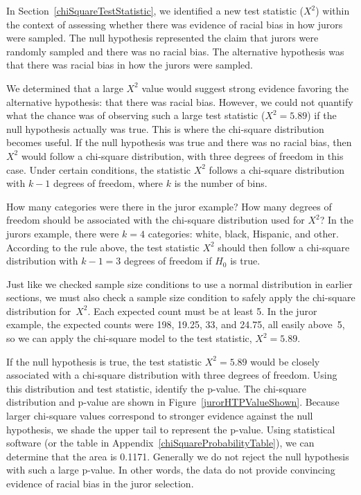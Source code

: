 In Section~\ref{chiSquareTestStatistic}, we identified a new test statistic ($X^2$) within the context of assessing whether there was evidence of racial bias in how jurors were sampled. The null hypothesis represented the claim that jurors were randomly sampled and there was no racial bias. The alternative hypothesis was that there was racial bias in how the jurors were sampled.

We determined that a large $X^2$ value would suggest strong evidence favoring the alternative hypothesis: that there was racial bias. However, we could not quantify what the chance was of observing such a large test statistic ($X^2=5.89$) if the null hypothesis actually was true. This is where the chi-square distribution becomes useful. If the null hypothesis was true and there was no racial bias, then $X^2$ would follow a chi-square distribution, with three degrees of freedom in this case. Under certain conditions, the statistic $X^2$ follows a chi-square distribution with $k - 1$ degrees of freedom, where $k$ is the number of bins.

\begin{examplewrap}
\begin{nexample}{How many categories were there in the juror example? How many degrees of freedom should be associated with the chi-square distribution used for $X^2$?}
In the jurors example, there were $k=4$ categories: white, black, Hispanic, and other. According to the rule above, the test statistic $X^2$ should then follow a chi-square distribution with $k-1 = 3$ degrees of freedom if $H_0$ is true.
\end{nexample}
\end{examplewrap}

Just like we checked sample size conditions to use a normal
distribution in earlier sections, we must also check a sample
size condition to safely apply the chi-square distribution
for~$X^2$.
Each expected count must be at least 5. In the juror example,
the expected counts were 198, 19.25, 33, and 24.75, all easily
above~5, so we can apply the chi-square model to the test
statistic, $X^2=5.89$.

\begin{examplewrap}
\begin{nexample}{If the null hypothesis is true,
    the test statistic $X^2=5.89$ would be closely
    associated with a chi-square distribution with
    three degrees of freedom.
    Using this distribution and test statistic,
    identify the p-value.}
  The chi-square distribution and p-value are shown in
  Figure~\ref{jurorHTPValueShown}.
  Because larger chi-square values correspond to stronger
  evidence against the null hypothesis, we shade the upper
  tail to represent the p-value.
  Using statistical software (or the table in
  Appendix~\ref{chiSquareProbabilityTable}),
  we can determine that the area is 0.1171.
  Generally we do not reject the null hypothesis
  with such a large p-value.
  In other words, the data do not provide convincing evidence
  of racial bias in the juror selection.
\end{nexample}
\end{examplewrap}

